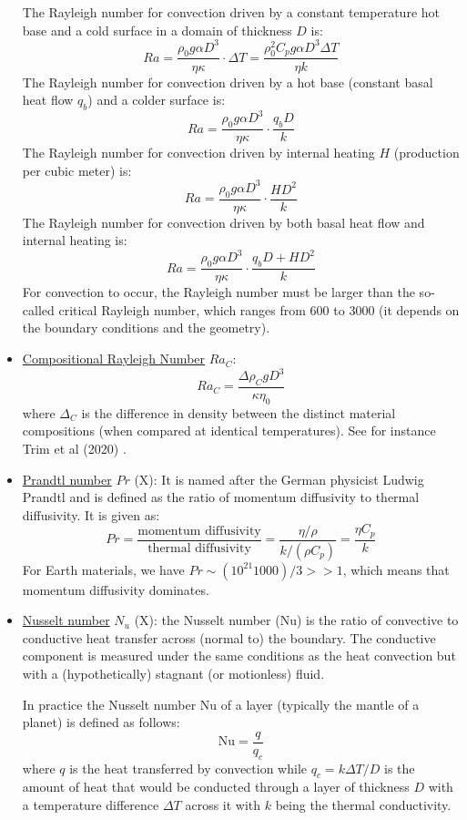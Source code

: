\begin{itemize}
The Rayleigh number for convection driven by a constant temperature hot base and a cold surface
in a domain of thickness $D$ is:
\[
Ra 
= \frac{\rho_0 g \alpha D^3 }{\eta \kappa}  \cdot  \Delta T
= \frac{\rho_0^2 C_p g \alpha D^3 \Delta T}{\eta k}
\]
The Rayleigh number for convection driven by a hot base (constant basal heat flow $q_b$)
and a colder surface is:
\[
Ra = \frac{\rho_0 g \alpha D^3}{\eta \kappa } \cdot  \frac{q_b D}{k}
\]  
The Rayleigh number for convection driven by internal heating $H$ (production per cubic meter) is:
\[
Ra = \frac{\rho_0 g \alpha D^3}{\eta \kappa} \cdot  \frac{H D^2}{k }
\]
The Rayleigh number for convection driven by both basal heat flow and internal heating is:	
\[
Ra = \frac{\rho_0 g \alpha D^3}{\eta \kappa} \cdot  \frac{q_b D + H D^2}{k }
\]
For convection to occur, the Rayleigh number must be larger than the so-called critical 
Rayleigh number, which ranges from 600 to 3000 (it depends on the boundary conditions and the 
geometry).

\item \underline{Compositional Rayleigh Number} $Ra_C$:  
\[
Ra_C= \frac{\Delta \rho_C  g  D^3}{\kappa \eta_0}
\]
where $\Delta_C$ is the difference in density between the distinct material compositions
(when compared at identical temperatures). See for instance Trim et al (2020) \cite{trlb20}.


\item \underline{Prandtl number} $Pr$ (X):  It is named after the German physicist 
Ludwig Prandtl and is defined as the ratio of momentum diffusivity to thermal diffusivity. It is given as: 
\[
Pr = \frac{\text{momentum diffusivity}}{\text{thermal diffusivity}} = \frac{\eta/\rho}{k/(\rho C_p)}= \frac{\eta C_p}{k}
\]
For Earth materials, we have $Pr \sim (10^{21} 1000)/3 >> 1$, which means that momentum diffusivity dominates.

\item \underline{Nusselt number} $N_u$ (X):   the Nusselt number (Nu) 
is the ratio of convective to conductive heat transfer across (normal to) the boundary. 
The conductive component is measured under the same conditions as the heat convection 
but with a (hypothetically) stagnant (or motionless) fluid.

In practice the Nusselt number Nu of a layer (typically the mantle of a planet) is defined as follows:
\begin{equation}
\text{Nu} = \frac{q}{q_c}
\end{equation} 
where $q$ is the heat transferred by convection while $q_c=k \Delta T /D$ 
is the amount of heat that would be conducted through a layer of
thickness $D$ with a temperature difference $\Delta T$ across it with 
$k$ being the thermal conductivity.


\end{itemize}
